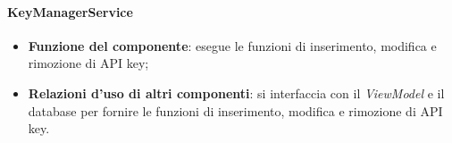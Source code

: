 \paragraph{KeyManagerService}
\begin{itemize}
	\item \textbf{Funzione del componente}: esegue le funzioni di inserimento, modifica e rimozione di API key;
	\item \textbf{Relazioni d'uso di altri componenti}: si interfaccia con il \textit{ViewModel} e il database per fornire le funzioni di inserimento, modifica e rimozione di API key.
\end{itemize}

